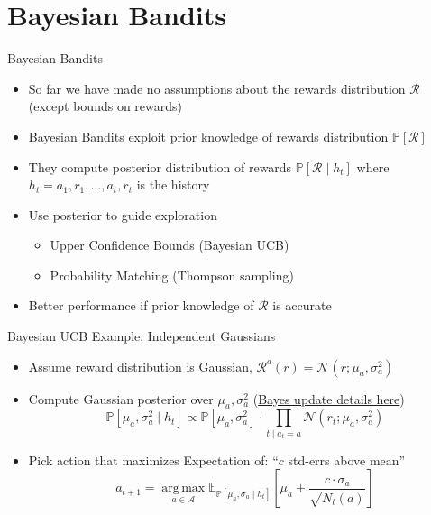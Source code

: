 \section{Bayesian Bandits}
\begin{frame}{Bayesian Bandits}
\begin{itemize}
    \item So far we have made no assumptions about the rewards distribution
          $\mathcal{R}$ (except bounds on rewards)
    \item Bayesian Bandits exploit prior knowledge of rewards distribution
          $\mathbb{P}[\mathcal{R}]$
    \item They compute posterior distribution of rewards $\mathbb{P}[\mathcal{R} \mid h_t]$ where
          $h_t = a_1, r_1, \ldots, a_t, r_t$ is the history
    \item Use posterior to guide exploration
    \begin{itemize}
        \item Upper Confidence Bounds (Bayesian UCB)
        \item Probability Matching (Thompson sampling)
    \end{itemize}
    \item Better performance if prior knowledge of $\mathcal{R}$ is accurate
\end{itemize}
\end{frame}

\begin{frame}{Bayesian UCB Example: Independent Gaussians}
\begin{itemize}
    \item Assume reward distribution is Gaussian, $\mathcal{R}^a(r) = \mathcal{N}(r; \mu_a, \sigma_a^2)$
    \item Compute Gaussian posterior over $\mu_a, \sigma_a^2$
          (\href{https://people.eecs.berkeley.edu/~jordan/courses/260-spring10/lectures/lecture5.pdf}{Bayes update details here})
    \[
        \mathbb{P}[\mu_a, \sigma_a^2 \mid h_t] \propto \mathbb{P}[\mu_a, \sigma_a^2] \cdot \prod_{t \mid a_t = a} \mathcal{N}(r_t; \mu_a, \sigma_a^2)
    \]
    \item Pick action that maximizes Expectation of: ``$c$ std-errs above mean''
    \[
        a_{t+1} = \operatorname*{arg\,max}_{a \in \mathcal{A}} \mathbb{E}_{\mathbb{P}[\mu_a, \sigma_a \mid h_t]}\!\left[\mu_a + \frac{c \cdot \sigma_a}{\sqrt{N_t(a)}}\right]
    \]
\end{itemize}
\end{frame}
